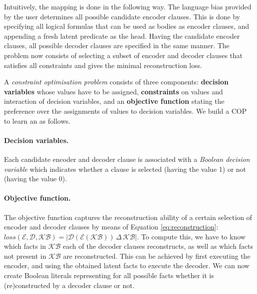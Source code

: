 Intuitively, the mapping is done in the following way.
The language bias provided by the user determines all possible candidate encoder clauses. This is done by specifying all logical formulas that can be used as bodies as encoder clauses, and appending a fresh latent predicate as the head.
Having the candidate encoder clauses, all possible decoder clauses are specified in the same manner.
The problem now consists of selecting a subset of encoder and decoder clauses that satisfies all constraints and gives the minimal reconstruction loss.



A \textit{constraint optimisation problem} consists of three components: \textbf{decision variables} whose values have to be assigned, \textbf{constraints} on values and interaction of decision variables, and an \textbf{objective function} stating the preference over the assignments of values to decision variables. We build a COP to learn an \alp{}  as follows.


\paragraph{Decision variables.}
Each candidate encoder and decoder clause is associated with a \textit{Boolean decision variable} which indicates whether a clause is selected (having the value 1) or not (having the value 0).


\paragraph{Objective function.}
The objective function captures the reconstruction ability of a certain selection of encoder and decoder clauses by means of Equation \ref{eq:reconstruction}: $loss(\mathcal{E},\mathcal{D},\mathcal{KB}) = | \mathcal{D}(\mathcal{E}(\mathcal{KB})) \, \Delta \, \mathcal{KB} |$.
To compute this, we have to know which facts in $\mathcal{KB}$ each of the decoder clauses reconstructs, as well as which facts not present in $\mathcal{KB}$ are reconstructed.
This can be achieved by first executing the encoder, and using the obtained latent facts to execute the decoder.
We can now create Boolean literals representing for all possible facts whether it is (re)constructed by a decoder clause or not.

